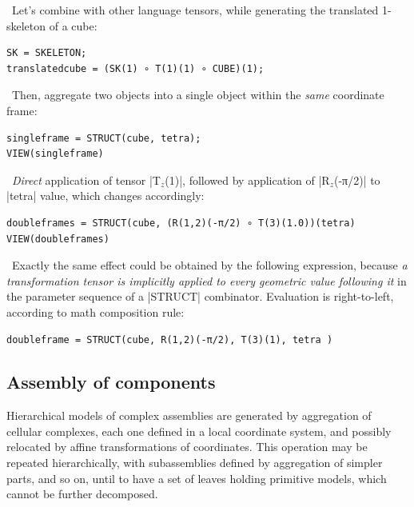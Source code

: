 \begin{coding}
\begin{coding}\ 
Let’s combine with other language tensors, while generating the translated 1-skeleton of a cube:
\begin{lstlisting}[language=JuliaLocal, style=julia, mathescape=true]
SK = SKELETON;
translatedcube = (SK(1) ∘ T(1)(1) ∘ CUBE)(1);
\end{lstlisting}
\end{coding}

\begin{coding}[Example.2]\ 
Then, aggregate two objects into a single object within the \emph{same} coordinate frame:
\begin{lstlisting}[language=JuliaLocal, style=julia, mathescape=true]
singleframe = STRUCT(cube, tetra);
VIEW(singleframe)
\end{lstlisting}
\end{coding}

\begin{coding}[Example.3]\ 
\emph{Direct} application of tensor |T$_z$(1)|, followed by application of |R$_z$(-π/2)| to |tetra| value, which changes accordingly:
\begin{lstlisting}[language=JuliaLocal, style=julia, mathescape=true]
doubleframes = STRUCT(cube, (R(1,2)(-π/2) ∘ T(3)(1.0))(tetra) 
VIEW(doubleframes)
\end{lstlisting}
\end{coding}

\begin{coding}[Example.4]\ 
Exactly the same effect could be obtained by the following expression, because \emph{a transformation tensor is implicitly applied to every geometric value following it} in the parameter sequence of a |STRUCT| combinator. Evaluation is right-to-left, according to math composition rule:
\begin{lstlisting}[language=JuliaLocal, style=julia, mathescape=true]
doubleframe = STRUCT(cube, R(1,2)(-π/2), T(3)(1), tetra )
\end{lstlisting}
\end{coding}

\subsection*{Assembly of components}\label{sect:4-3-2}

Hierarchical models of complex assemblies are generated by aggregation of cellular complexes, each one defined in a local coordinate system, and possibly
relocated by affine transformations of coordinates.  This operation may be repeated
hierarchically, with subassemblies defined by aggregation of simpler parts, and so
on, until to have a set of leaves holding primitive models, which cannot be further decomposed.


\end{coding}
